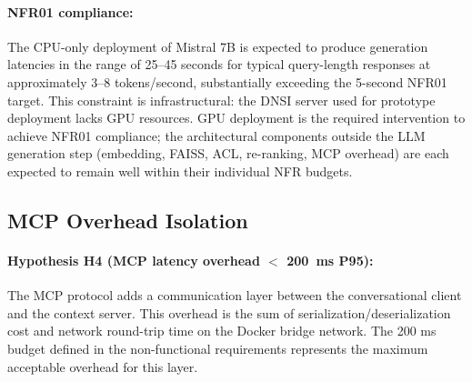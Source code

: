 
\paragraph{NFR01 compliance:} The CPU-only deployment of Mistral 7B is expected to produce generation latencies in the range of 25--45 seconds for typical query-length responses at approximately 3--8 tokens/second, substantially exceeding the 5-second NFR01 target. This constraint is infrastructural: the DNSI server used for prototype deployment lacks GPU resources. GPU deployment is the required intervention to achieve NFR01 compliance; the architectural components outside the LLM generation step (embedding, FAISS, ACL, re-ranking, MCP overhead) are each expected to remain well within their individual NFR budgets.

\subsection{MCP Overhead Isolation}

\paragraph{Hypothesis H4 (MCP latency overhead $<$ 200~ms P95):} The MCP protocol adds a communication layer between the conversational client and the context server. This overhead is the sum of serialization/deserialization cost and network round-trip time on the Docker bridge network. The 200 ms budget defined in the non-functional requirements represents the maximum acceptable overhead for this layer.



